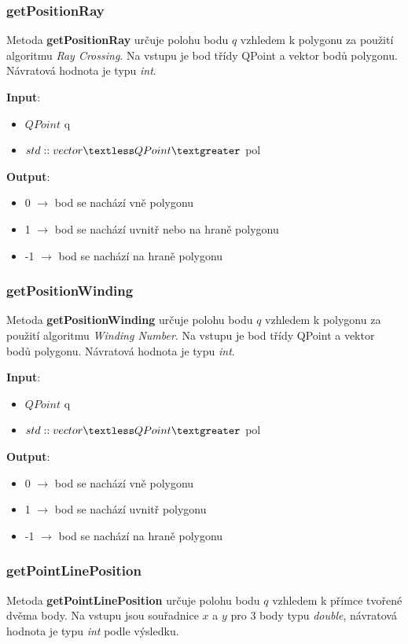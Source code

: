 \documentclass[a4paper, 12pt]{article}
\begin{document}
\subsubsection{getPositionRay}
Metoda \textbf{getPositionRay} určuje polohu bodu $q$ vzhledem k polygonu za použití algoritmu \textsl{Ray Crossing}. Na vstupu je bod třídy QPoint a vektor bodů polygonu. Návratová hodnota je typu \textsl{int}.

\textbf{Input}:
\begin{itemize}
\item $QPoint$ q
\item $std::vector\textless QPoint\textgreater$ pol
\end{itemize}

\textbf{Output}:
\begin{itemize}
\item 0 $\rightarrow$ bod se nachází vně polygonu
\item 1 $\rightarrow$ bod se nachází uvnitř nebo na hraně polygonu
\item -1 $\rightarrow$ bod se nachází na hraně polygonu
\end{itemize}

\subsubsection{getPositionWinding}
Metoda \textbf{getPositionWinding} určuje polohu bodu $q$ vzhledem k polygonu za použití algoritmu \textsl{Winding Number}. Na vstupu je bod třídy QPoint a vektor bodů polygonu. Návratová hodnota je typu \textsl{int}.

\textbf{Input}:
\begin{itemize}
\item $QPoint$ q
\item $std::vector\textless QPoint\textgreater$ pol
\end{itemize}

\textbf{Output}:
\begin{itemize}
\item 0 $\rightarrow$ bod se nachází vně polygonu
\item 1 $\rightarrow$ bod se nachází uvnitř polygonu
\item -1 $\rightarrow$ bod se nachází na hraně polygonu
\end{itemize}

\subsubsection{getPointLinePosition}
Metoda \textbf{getPointLinePosition} určuje polohu bodu $q$ vzhledem k přímce tvořené dvěma body. Na vstupu jsou souřadnice $x$ a $y$ pro 3 body typu \textit{double}, návratová hodnota je typu \textit{int} podle výsledku. 
\end{document}

